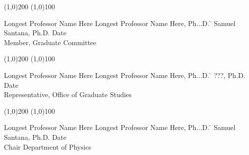 \noindent
\line(1,0){200} \hspace{40 mm} \line(1,0){100}\\
\noindent
\vspace{-1.75\baselineskip}
\begin{tabbing}
Longest Professor Name Here Longest Professor Name Here, Ph...D.   \=  \kill 
Samuel Santana, Ph.D. \>  Date\\Member, Graduate Committee
\end{tabbing}

\noindent
\line(1,0){200} \hspace{40 mm} \line(1,0){100}\\
\noindent
\vspace{-1.75\baselineskip}
\begin{tabbing}
Longest Professor Name Here Longest Professor Name Here, Ph...D.   \=  \kill 
???, Ph.D. \>  Date\\Representative, Office of Graduate Studies
\end{tabbing}

\noindent
\line(1,0){200} \hspace{40 mm} \line(1,0){100}\\
\noindent
\vspace{-1.75\baselineskip}
\begin{tabbing}
Longest Professor Name Here Longest Professor Name Here, Ph...D.   \=  \kill 
Samuel Santana, Ph.D. \>  Date\\Chair Department of Physics
\end{tabbing}

